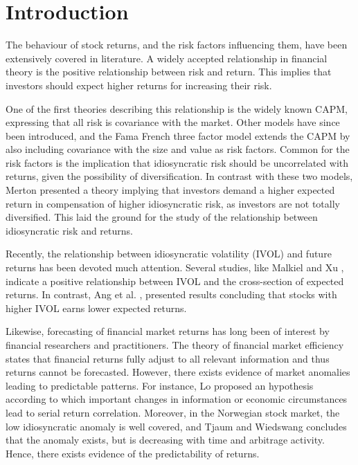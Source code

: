 \chapter{Introduction}
The behaviour of stock returns, and the risk factors influencing them, have been extensively covered in literature. A widely accepted relationship in financial theory is the positive relationship between risk and return. This implies that investors should expect higher returns for increasing their risk.

One of the first theories describing this relationship is the widely known CAPM, expressing that all risk is covariance with the market. Other models have since been introduced, and the Fama French three factor model \cite{famafrench} extends the CAPM by also including covariance with the size and value as risk factors. Common for the risk factors is the implication that idiosyncratic risk should be uncorrelated with returns, given the possibility of diversification. In contrast with these two models, Merton \cite{merton87} presented a theory implying that investors demand a higher expected return in compensation of higher idiosyncratic risk, as investors are not totally diversified. This laid the ground for the study of the relationship between idiosyncratic risk and returns.

Recently, the relationship between idiosyncratic volatility (IVOL) and future returns has been devoted much attention. Several studies, like Malkiel and Xu \cite{malkielxu02}, indicate a positive relationship between IVOL and the cross-section of expected returns. In contrast, Ang et al. \cite{angetal06}, presented results concluding that stocks with higher IVOL earns lower expected returns.

Likewise, forecasting of financial market returns has long been of interest by financial researchers and practitioners. The theory of financial market efficiency states that financial returns fully adjust to all relevant information and thus returns cannot be forecasted. However, there exists evidence of market anomalies leading to predictable patterns. For instance, Lo \cite{Lo} proposed an hypothesis according to which important changes in information or economic circumstances lead to serial return correlation. Moreover, in the Norwegian stock market, the low idiosyncratic anomaly is well covered, and Tjaum and Wiedswang \cite{thaumwiedswang} concludes that the anomaly exists, but is decreasing with time and arbitrage activity. Hence, there exists evidence of the predictability of returns.

